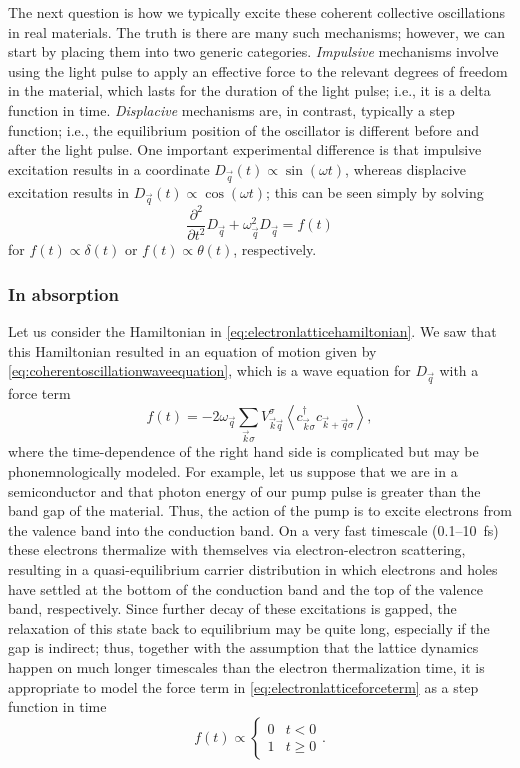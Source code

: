 The next question is how we typically excite these coherent collective oscillations in real materials.
The truth is there are many such mechanisms; however, we can start by placing them into two generic categories.
\emph{Impulsive} mechanisms involve using the light pulse to apply an effective force to the relevant degrees of freedom in the material, which lasts for the duration of the light pulse; i.e., it is a delta function in time.
\emph{Displacive} mechanisms are, in contrast, typically a step function; i.e., the equilibrium position of the oscillator is different before and after the light pulse.
One important experimental difference is that impulsive excitation results in a coordinate $D_{\vec{q}}(t)\propto\sin(\omega t)$, whereas displacive excitation results in $D_{\vec{q}}(t)\propto\cos(\omega t)$; this can be seen simply by solving
\begin{equation}\label{eq:Dqequationofmotion}
\frac{\partial^2}{\partial t^2}D_{\vec{q}}+\omega^2_{\vec{q}}D_{\vec{q}} = f(t)
\end{equation}
for $f(t)\propto \delta(t)$ or $f(t)\propto \theta(t)$, respectively.

\subsubsection{In absorption}

Let us consider the Hamiltonian in \cref{eq:electronlatticehamiltonian}.
We saw that this Hamiltonian resulted in an equation of motion given by \cref{eq:coherentoscillationwaveequation}, which is a wave equation for $D_{\vec{q}}$ with a force term
\begin{equation}\label{eq:electronlatticeforceterm}
f(t) = -2\omega_{\vec{q}}\sum_{\vec{k}\sigma}V^\sigma_{\vec{k}\vec{q}}\left<c^\dagger_{\vec{k}\sigma} c_{\vec{k}+\vec{q}\sigma}\right>,
\end{equation}
where the time-dependence of the right hand side is complicated but may be phonemnologically modeled.
For example, let us suppose that we are in a semiconductor and that photon energy of our pump pulse is greater than the band gap of the material.
Thus, the action of the pump is to excite electrons from the valence band into the conduction band.
On a very fast timescale (\num{0.1}--\qty{10}{fs}) these electrons thermalize with themselves via electron-electron scattering, resulting in a quasi-equilibrium carrier distribution in which electrons and holes have settled at the bottom of the conduction band and the top of the valence band, respectively.
Since further decay of these excitations is gapped, the relaxation of this state back to equilibrium may be quite long, especially if the gap is indirect; thus, together with the assumption that the lattice dynamics happen on much longer timescales than the electron thermalization time, it is appropriate to model the force term in \cref{eq:electronlatticeforceterm} as a step function in time
\begin{equation}
f(t) \propto \begin{cases} 0 & t<0\\1 & t\ge 0 \end{cases}.
\end{equation}

